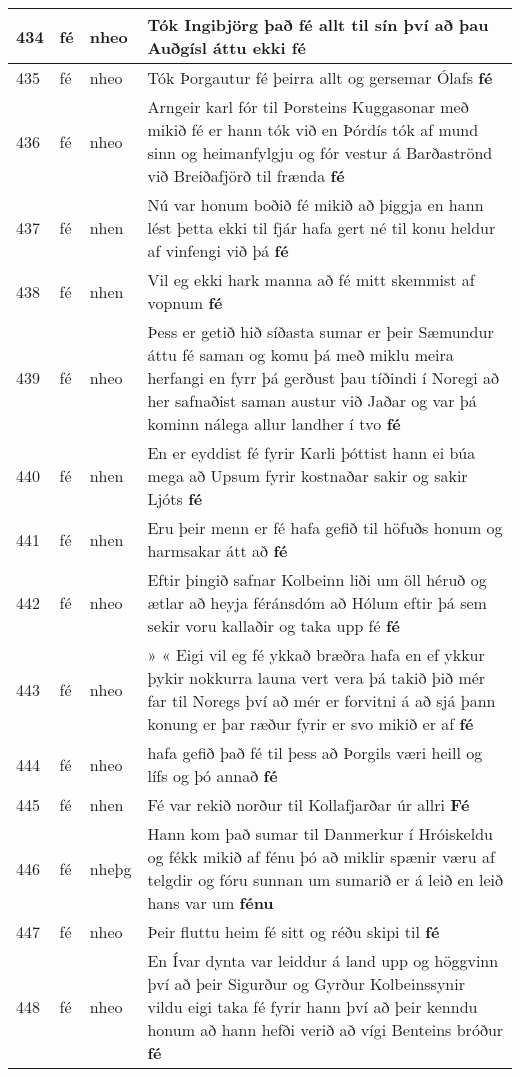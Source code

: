 \documentclass{article}
\begin{document}
\begin{longtable}{p{1cm}|p{1cm}|p{1cm}|p{13cm}}
\hline
434&fé&nheo&Tók Ingibjörg það fé allt til sín því að þau Auðgísl áttu ekki \textbf{fé} \\
\hline
435&fé&nheo&Tók Þorgautur fé þeirra allt og gersemar Ólafs \textbf{fé} \\
\hline
436&fé&nheo&Arngeir karl fór til Þorsteins Kuggasonar með mikið fé er hann tók við en Þórdís tók af mund sinn og heimanfylgju og fór vestur á Barðaströnd við Breiðafjörð til frænda \textbf{fé} \\
\hline
437&fé&nhen&Nú var honum boðið fé mikið að þiggja en hann lést þetta ekki til fjár hafa gert né til konu heldur af vinfengi við þá \textbf{fé} \\
\hline
438&fé&nhen&Vil eg ekki hark manna að fé mitt skemmist af vopnum \textbf{fé} \\
\hline
439&fé&nheo&Þess er getið hið síðasta sumar er þeir Sæmundur áttu fé saman og komu þá með miklu meira herfangi en fyrr þá gerðust þau tíðindi í Noregi að her safnaðist saman austur við Jaðar og var þá kominn nálega allur landher í tvo \textbf{fé} \\
\hline
440&fé&nhen&En er eyddist fé fyrir Karli þóttist hann ei búa mega að Upsum fyrir kostnaðar sakir og sakir Ljóts \textbf{fé} \\
\hline
441&fé&nhen&Eru þeir menn er fé hafa gefið til höfuðs honum og harmsakar átt að \textbf{fé} \\
\hline
442&fé&nheo&Eftir þingið safnar Kolbeinn liði um öll héruð og ætlar að heyja féránsdóm að Hólum eftir þá sem sekir voru kallaðir og taka upp fé \textbf{fé} \\
\hline
443&fé&nheo&» « Eigi vil eg fé ykkað bræðra hafa en ef ykkur þykir nokkurra launa vert vera þá takið þið mér far til Noregs því að mér er forvitni á að sjá þann konung er þar ræður fyrir er svo mikið er af \textbf{fé} \\
\hline
444&fé&nheo&hafa gefið það fé til þess að Þorgils væri heill og lífs og þó annað \textbf{fé} \\
\hline
445&fé&nhen&Fé var rekið norður til Kollafjarðar úr allri \textbf{Fé} \\
\hline
446&fé&nheþg&Hann kom það sumar til Danmerkur í Hróiskeldu og fékk mikið af fénu þó að miklir spænir væru af telgdir og fóru sunnan um sumarið er á leið en leið hans var um \textbf{fénu} \\
\hline
447&fé&nheo&Þeir fluttu heim fé sitt og réðu skipi til \textbf{fé} \\
\hline
448&fé&nheo&En Ívar dynta var leiddur á land upp og höggvinn því að þeir Sigurður og Gyrður Kolbeinssynir vildu eigi taka fé fyrir hann því að þeir kenndu honum að hann hefði verið að vígi Benteins bróður \textbf{fé} \\

\end{longtable}
\end{document}
